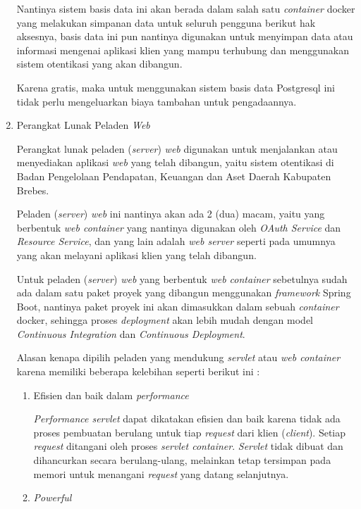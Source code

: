 \documentclass[pdftex,12pt, oneside]{article}
\begin{document}
\begin{enumerate}
Nantinya sistem basis data ini akan berada dalam salah satu \textit{container} docker yang melakukan simpanan data untuk seluruh pengguna berikut hak aksesnya, basis data ini pun nantinya digunakan untuk menyimpan data atau informasi mengenai aplikasi klien yang mampu terhubung dan menggunakan sistem otentikasi yang akan dibangun.

Karena gratis, maka untuk menggunakan sistem basis data Postgresql ini tidak perlu mengeluarkan biaya tambahan untuk pengadaannya.

	\item Perangkat Lunak Peladen \textit{Web}
	
Perangkat lunak peladen (\textit{server}) \textit{web} digunakan untuk menjalankan atau menyediakan aplikasi \textit{web} yang telah dibangun, yaitu sistem otentikasi di Badan Pengelolaan Pendapatan, Keuangan dan Aset Daerah Kabupaten Brebes.

Peladen (\textit{server}) \textit{web} ini nantinya akan ada 2 (dua) macam, yaitu yang berbentuk \textit{web container} yang nantinya digunakan oleh \textit{OAuth Service} dan \textit{Resource Service}, dan yang lain adalah \textit{web server} seperti pada umumnya yang akan melayani aplikasi klien yang telah dibangun.

Untuk peladen (\textit{server}) \textit{web} yang berbentuk \textit{web container} sebetulnya sudah ada dalam satu paket proyek yang dibangun menggunakan \textit{framework} Spring Boot, nantinya paket proyek ini akan dimasukkan dalam sebuah \textit{container} docker, sehingga proses \textit{deployment} akan lebih mudah dengan model \textit{Continuous Integration} dan \textit{Continuous Deployment}.

Alasan kenapa dipilih peladen yang mendukung \textit{servlet} atau \textit{web container} karena memiliki beberapa kelebihan seperti berikut ini :

	\begin{enumerate}
		\item Efisien dan baik dalam \textit{performance}
		
\textit{Performance servlet} dapat dikatakan efisien dan baik karena tidak ada proses pembuatan berulang untuk tiap \textit{request} dari klien (\textit{client}). Setiap \textit{request} ditangani oleh proses \textit{servlet container}. \textit{Servlet} tidak dibuat dan dihancurkan secara berulang-ulang, melainkan tetap tersimpan pada memori untuk menangani \textit{request} yang datang selanjutnya.

		\item \textit{Powerful}


\end{enumerate}
\end{enumerate}
\end{document}
